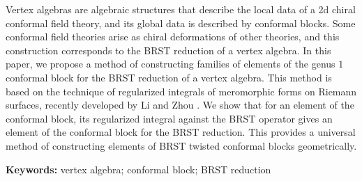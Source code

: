 Vertex algebras are algebraic structures that describe
the local data of a 2d chiral conformal field theory,
and its global data is described by conformal blocks.
Some conformal field theories arise as
chiral deformations of other theories,
and this construction corresponds
to the BRST reduction of a vertex algebra.
In this paper,
we propose a method of constructing families of
elements of the genus $1$ conformal block
for the BRST reduction of a vertex algebra.
This method is based on the technique of
regularized integrals of meromorphic forms on Riemann surfaces,
recently developed by Li and Zhou \cite{regularized}.
We show that
for an element of the conformal block,
its regularized integral against the BRST operator
gives an element of the conformal block
for the BRST reduction.
This provides a universal method of
constructing elements of BRST twisted conformal blocks geometrically.

\bigskip

\noindent
\textbf{Keywords:}
vertex algebra; conformal block; BRST reduction
